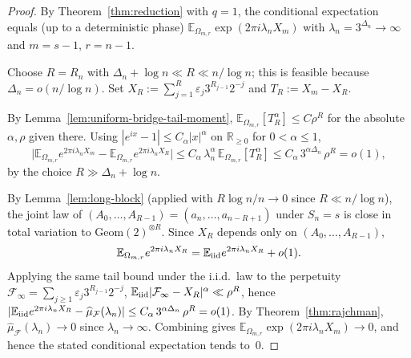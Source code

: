 \documentclass[11pt,a4paper]{amsart}
\theoremstyle{plain}
\theoremstyle{definition}
\newcommand{\R}{\mathbb{R}}
\newcommand{\E}{\mathbb{E}}
\newcommand{\Geom}{\mathrm{Geom}}
\begin{document}
\begin{proof}
By Theorem~\ref{thm:reduction} with $q=1$, the conditional expectation
equals (up to a deterministic phase) $\E_{\Omega_{m,r}}\exp(2\pi i\lambda_n X_m)$
with $\lambda_n=3^{\Delta_n}\to\infty$ and $m=s-1$, $r=n-1$.

Choose $R=R_n$ with
$\Delta_n+\log n\ll R\ll n/\log n$;
this is feasible because $\Delta_n=o(n/\log n)$.
Set $X_R:=\sum_{j=1}^R\varepsilon_j 3^{R_{j-1}}2^{-j}$ and $T_R:=X_m-X_R$.

By Lemma~\ref{lem:uniform-bridge-tail-moment},
$\E_{\Omega_{m,r}}[T_R^\alpha]\le C\rho^R$ for the absolute
$\alpha,\rho$ given there.
Using $|e^{ix}-1|\le C_\alpha|x|^\alpha$ on $\R_{\ge 0}$ for $0<\alpha\le 1$,
$$
\bigl|\E_{\Omega_{m,r}}e^{2\pi i\lambda_n X_m}-\E_{\Omega_{m,r}}e^{2\pi i\lambda_n X_R}\bigr|
\le C_\alpha\,\lambda_n^\alpha\,\E_{\Omega_{m,r}}[T_R^\alpha]
\le C_\alpha\,3^{\alpha\Delta_n}\,\rho^R=o(1),
$$
by the choice $R\gg\Delta_n+\log n$.

By Lemma~\ref{lem:long-block} (applied with $R\log n/n\to 0$ since
$R\ll n/\log n$), the joint law of $(A_0,\dots,A_{R-1})=(a_n,\dots,a_{n-R+1})$
under $S_n=s$ is close in total variation to $\Geom(2)^{\otimes R}$.
Since $X_R$ depends only on $(A_0,\dots,A_{R-1})$,
$$
\E_{\Omega_{m,r}}e^{2\pi i\lambda_n X_R}
=\E_{\rm iid}e^{2\pi i\lambda_n X_R}+o(1).
$$
Applying the same tail bound under the i.i.d.\ law to the perpetuity
$\mathcal F_\infty=\sum_{j\ge 1}\varepsilon_j 3^{R_{j-1}}2^{-j}$,
$\E_{\rm iid}|\mathcal F_\infty-X_R|^\alpha\ll\rho^R$, hence
$|\E_{\rm iid}e^{2\pi i\lambda_n X_R}-\widehat\mu_{\mathcal F}(\lambda_n)|
\le C_\alpha\,3^{\alpha\Delta_n}\,\rho^R=o(1)$.
By Theorem~\ref{thm:rajchman}, $\widehat\mu_{\mathcal F}(\lambda_n)\to 0$
since $\lambda_n\to\infty$.
Combining gives $\E_{\Omega_{m,r}}\exp(2\pi i\lambda_n X_m)\to 0$,
and hence the stated conditional expectation tends to~$0$.
\end{proof}
\end{document}
